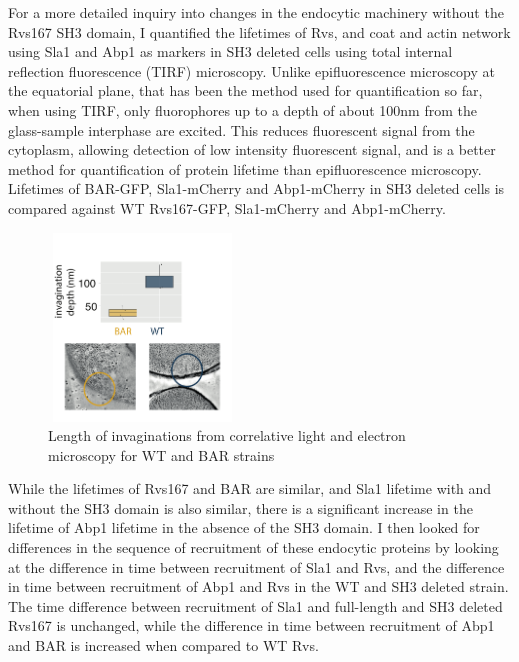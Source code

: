 For a more detailed inquiry into changes in the endocytic machinery without the Rvs167 SH3 domain, I quantified the lifetimes of Rvs, and coat and actin network using Sla1 and Abp1 as markers in SH3 deleted cells using total internal reflection fluorescence (TIRF) microscopy. Unlike epifluorescence microscopy at the equatorial plane, that has been the method used for quantification so far, when using TIRF, only fluorophores up to a depth of about 100nm from the glass-sample interphase are excited. This reduces fluorescent signal from the cytoplasm, allowing detection of low intensity fluorescent signal, and is a better method for quantification of protein lifetime than epifluorescence microscopy. Lifetimes of BAR-GFP, Sla1-mCherry and Abp1-mCherry in SH3 deleted cells is compared against WT Rvs167-GFP, Sla1-mCherry and Abp1-mCherry. 

\begin{figure}
	\centering
	\includegraphics[width=5cm,height=5cm,keepaspectratio]{figures/results_final/clem}
	\caption [Effect of the Rvs167 SH3 deletion]
	{Length of invaginations from correlative light and electron microscopy for WT and BAR strains}
\end{figure}
\vspace{5mm}
	
	\vspace{5mm}
While the lifetimes of Rvs167 and BAR are similar, and Sla1 lifetime with and without the SH3 domain is also similar, there is a significant increase in the lifetime of Abp1 lifetime in the absence of the SH3 domain. I then looked for differences in the sequence of recruitment of these endocytic proteins by looking at the difference in time between recruitment of Sla1 and Rvs, and the difference in time between recruitment of Abp1 and Rvs in the WT and SH3 deleted strain. The time difference between recruitment of Sla1 and full-length and SH3 deleted Rvs167 is unchanged, while the difference in time between recruitment of Abp1 and BAR is increased when compared to WT Rvs.

